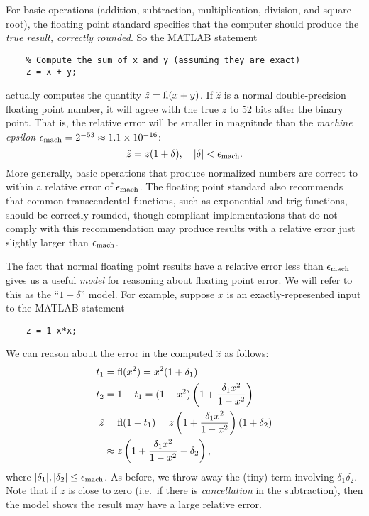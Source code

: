 \documentclass[12pt, leqno]{article}
\begin{document}
For basic operations (addition, subtraction, multiplication,
division, and square root), the floating point standard specifies that
the computer should produce the {\em true result, correctly rounded}.
So the MATLAB statement
\lstset{language=matlab,columns=flexible}
\begin{lstlisting}
    % Compute the sum of x and y (assuming they are exact)
    z = x + y;
\end{lstlisting}
actually computes the quantity $\hat{z} = \operatorname{fl}(x+y)$.  If $\hat{z}$ is
a normal double-precision floating point number, it will agree with
the true $z$ to 52 bits after the binary point.  That is, the relative
error will be smaller in magnitude than the {\em machine epsilon}
$\epsilon_{\mathrm{mach}} = 2^{-53} \approx 1.1 \times 10^{-16}$:
\[
  \hat{z} = z(1+\delta), \quad |\delta| < \epsilon_{\mathrm{mach}}.
\]
More generally, basic operations that produce normalized numbers are
correct to within a relative error of $\epsilon_{\mathrm{mach}}$.  The floating
point standard also recommends that common transcendental functions,
such as exponential and trig functions, should be correctly rounded,
though compliant implementations that do not comply with this
recommendation may produce results with a relative error
just slightly larger than $\epsilon_{\mathrm{mach}}$.

The fact that normal floating point results have a relative error
less than $\epsilon_{\mathrm{mach}}$ gives us a useful {\em model} for reasoning about
floating point error.  We will refer to this as the ``$1 + \delta$''
model.  For example, suppose $x$ is an exactly-represented input to
the MATLAB statement
\begin{lstlisting}
    z = 1-x*x;
\end{lstlisting}
We can reason about the error in the computed $\hat{z}$ as follows:
\begin{align*}
  t_1 &= \operatorname{fl}(x^2) = x^2 (1+\delta_1) \\
  t_2 &= 1-t_1 = (1-x^2)\left( 1 + \frac{\delta_1 x^2}{1-x^2} \right) \\
  \hat{z}
  &= \operatorname{fl}(1-t_1)
    = z \left( 1 + \frac{\delta_1 x^2}{1-x^2} \right)(1+\delta_2) \\
  & \approx z \left( 1 + \frac{\delta_1 x^2}{1-x^2} +\delta_2 \right),
\end{align*}
where $|\delta_1|, |\delta_2| \leq \epsilon_{\mathrm{mach}}$.  As before, we throw
away the (tiny) term involving $\delta_1 \delta_2$.
Note that if $z$ is close to zero (i.e.~if there is {\em cancellation} in the
subtraction), then the model shows the result may have a
large relative error.
\end{document}
